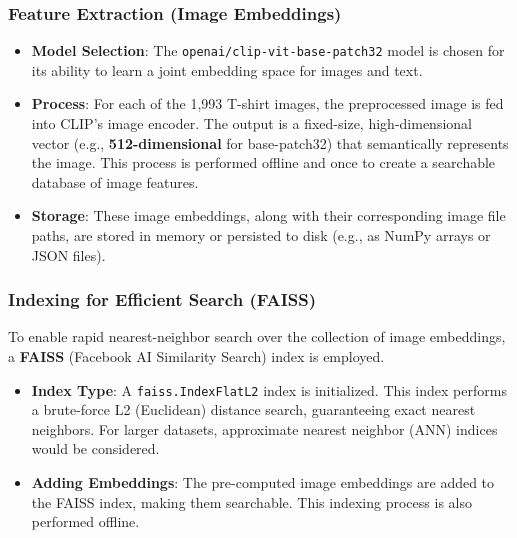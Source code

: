 \documentclass{article}
\begin{document}
\subsubsection{Feature Extraction (Image Embeddings)}
\begin{itemize}
    \item \textbf{Model Selection}: The \texttt{openai/clip-vit-base-patch32} model is chosen for its ability to learn a joint embedding space for images and text.
    \item \textbf{Process}: For each of the 1,993 T-shirt images, the preprocessed image is fed into CLIP's image encoder. The output is a fixed-size, high-dimensional vector (e.g., \textbf{512-dimensional} for base-patch32) that semantically represents the image. This process is performed offline and once to create a searchable database of image features.
    \item \textbf{Storage}: These image embeddings, along with their corresponding image file paths, are stored in memory or persisted to disk (e.g., as NumPy arrays or JSON files).
\end{itemize}

\subsubsection{Indexing for Efficient Search (FAISS)}
To enable rapid nearest-neighbor search over the collection of image embeddings, a \textbf{FAISS} (Facebook AI Similarity Search) index is employed.
\begin{itemize}
    \item \textbf{Index Type}: A \texttt{faiss.IndexFlatL2} index is initialized. This index performs a brute-force L2 (Euclidean) distance search, guaranteeing exact nearest neighbors. For larger datasets, approximate nearest neighbor (ANN) indices would be considered.
    \item \textbf{Adding Embeddings}: The pre-computed image embeddings are added to the FAISS index, making them searchable. This indexing process is also performed offline.
\end{itemize}
\end{document}
